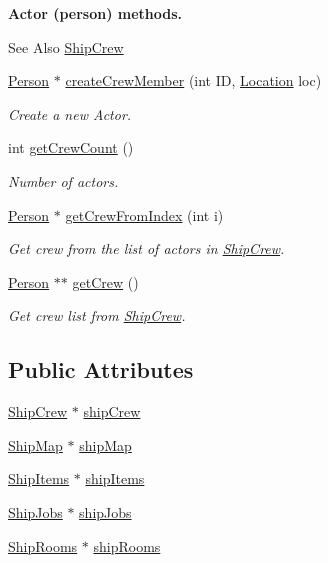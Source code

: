 \begin{Indent}{\bf Actor (person) methods.}\par
{\em \begin{DoxySeeAlso}{See Also}
\hyperlink{classShipCrew}{Ship\-Crew} 
\end{DoxySeeAlso}
}\begin{DoxyCompactItemize}
\item 
\hyperlink{classPerson}{Person} $\ast$ \hyperlink{classShipMaster_af1e9d8713eb387b216cc80e11728ce4d}{create\-Crew\-Member} (int I\-D, \hyperlink{structLocation}{Location} loc)
\begin{DoxyCompactList}\small\item\em Create a new Actor. \end{DoxyCompactList}\item 
int \hyperlink{classShipMaster_a49b39499c31975773052fa6c162000ed}{get\-Crew\-Count} ()
\begin{DoxyCompactList}\small\item\em Number of actors. \end{DoxyCompactList}\item 
\hyperlink{classPerson}{Person} $\ast$ \hyperlink{classShipMaster_a0fa00005b82784c63799552a3a29bdb0}{get\-Crew\-From\-Index} (int i)
\begin{DoxyCompactList}\small\item\em Get crew from the list of actors in \hyperlink{classShipCrew}{Ship\-Crew}. \end{DoxyCompactList}\item 
\hyperlink{classPerson}{Person} $\ast$$\ast$ \hyperlink{classShipMaster_a99b6b1f1035358b6083b3df3c7e52024}{get\-Crew} ()
\begin{DoxyCompactList}\small\item\em Get crew list from \hyperlink{classShipCrew}{Ship\-Crew}. \end{DoxyCompactList}\end{DoxyCompactItemize}
\end{Indent}
\subsection*{Public Attributes}
\begin{DoxyCompactItemize}
\item 
\hyperlink{classShipCrew}{Ship\-Crew} $\ast$ \hyperlink{classShipMaster_a7f0c72b72e582c85dd582a1ffdceabdb}{ship\-Crew}
\item 
\hyperlink{classShipMap}{Ship\-Map} $\ast$ \hyperlink{classShipMaster_ad9033bf87a43b439646616bbc92dfe03}{ship\-Map}
\item 
\hyperlink{classShipItems}{Ship\-Items} $\ast$ \hyperlink{classShipMaster_a9eedfb4e38a7b7db557ce2d1330bfe4e}{ship\-Items}
\item 
\hyperlink{classShipJobs}{Ship\-Jobs} $\ast$ \hyperlink{classShipMaster_a1a204eb61598354bc650c3322d132a33}{ship\-Jobs}
\item 
\hyperlink{classShipRooms}{Ship\-Rooms} $\ast$ \hyperlink{classShipMaster_a8a39f20c1107f8d6f6c081817e40dbfd}{ship\-Rooms}
\end{DoxyCompactItemize}


